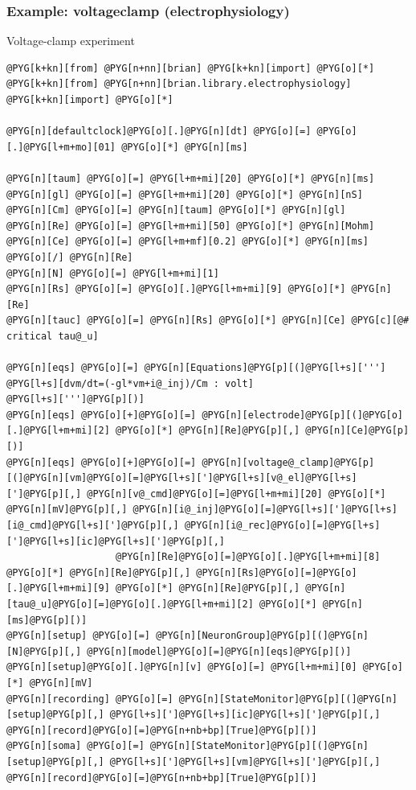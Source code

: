 \documentclass[letterpaper,10pt,english]{manual}
\begin{document}
\resetcurrentobjects
\hypertarget{--doc-examples-electrophysiology_voltageclamp}{}

\hypertarget{index-26}{}\subsubsection{Example: voltageclamp (electrophysiology)}

Voltage-clamp experiment

\begin{Verbatim}[commandchars=@\[\]]
@PYG[k+kn][from] @PYG[n+nn][brian] @PYG[k+kn][import] @PYG[o][*]
@PYG[k+kn][from] @PYG[n+nn][brian.library.electrophysiology] @PYG[k+kn][import] @PYG[o][*]

@PYG[n][defaultclock]@PYG[o][.]@PYG[n][dt] @PYG[o][=] @PYG[o][.]@PYG[l+m+mo][01] @PYG[o][*] @PYG[n][ms]

@PYG[n][taum] @PYG[o][=] @PYG[l+m+mi][20] @PYG[o][*] @PYG[n][ms]
@PYG[n][gl] @PYG[o][=] @PYG[l+m+mi][20] @PYG[o][*] @PYG[n][nS]
@PYG[n][Cm] @PYG[o][=] @PYG[n][taum] @PYG[o][*] @PYG[n][gl]
@PYG[n][Re] @PYG[o][=] @PYG[l+m+mi][50] @PYG[o][*] @PYG[n][Mohm]
@PYG[n][Ce] @PYG[o][=] @PYG[l+m+mf][0.2] @PYG[o][*] @PYG[n][ms] @PYG[o][/] @PYG[n][Re]
@PYG[n][N] @PYG[o][=] @PYG[l+m+mi][1]
@PYG[n][Rs] @PYG[o][=] @PYG[o][.]@PYG[l+m+mi][9] @PYG[o][*] @PYG[n][Re]
@PYG[n][tauc] @PYG[o][=] @PYG[n][Rs] @PYG[o][*] @PYG[n][Ce] @PYG[c][@# critical tau@_u]

@PYG[n][eqs] @PYG[o][=] @PYG[n][Equations]@PYG[p][(]@PYG[l+s][''']
@PYG[l+s][dvm/dt=(-gl*vm+i@_inj)/Cm : volt]
@PYG[l+s][''']@PYG[p][)]
@PYG[n][eqs] @PYG[o][+]@PYG[o][=] @PYG[n][electrode]@PYG[p][(]@PYG[o][.]@PYG[l+m+mi][2] @PYG[o][*] @PYG[n][Re]@PYG[p][,] @PYG[n][Ce]@PYG[p][)]
@PYG[n][eqs] @PYG[o][+]@PYG[o][=] @PYG[n][voltage@_clamp]@PYG[p][(]@PYG[n][vm]@PYG[o][=]@PYG[l+s][']@PYG[l+s][v@_el]@PYG[l+s][']@PYG[p][,] @PYG[n][v@_cmd]@PYG[o][=]@PYG[l+m+mi][20] @PYG[o][*] @PYG[n][mV]@PYG[p][,] @PYG[n][i@_inj]@PYG[o][=]@PYG[l+s][']@PYG[l+s][i@_cmd]@PYG[l+s][']@PYG[p][,] @PYG[n][i@_rec]@PYG[o][=]@PYG[l+s][']@PYG[l+s][ic]@PYG[l+s][']@PYG[p][,]
                   @PYG[n][Re]@PYG[o][=]@PYG[o][.]@PYG[l+m+mi][8] @PYG[o][*] @PYG[n][Re]@PYG[p][,] @PYG[n][Rs]@PYG[o][=]@PYG[o][.]@PYG[l+m+mi][9] @PYG[o][*] @PYG[n][Re]@PYG[p][,] @PYG[n][tau@_u]@PYG[o][=]@PYG[o][.]@PYG[l+m+mi][2] @PYG[o][*] @PYG[n][ms]@PYG[p][)]
@PYG[n][setup] @PYG[o][=] @PYG[n][NeuronGroup]@PYG[p][(]@PYG[n][N]@PYG[p][,] @PYG[n][model]@PYG[o][=]@PYG[n][eqs]@PYG[p][)]
@PYG[n][setup]@PYG[o][.]@PYG[n][v] @PYG[o][=] @PYG[l+m+mi][0] @PYG[o][*] @PYG[n][mV]
@PYG[n][recording] @PYG[o][=] @PYG[n][StateMonitor]@PYG[p][(]@PYG[n][setup]@PYG[p][,] @PYG[l+s][']@PYG[l+s][ic]@PYG[l+s][']@PYG[p][,] @PYG[n][record]@PYG[o][=]@PYG[n+nb+bp][True]@PYG[p][)]
@PYG[n][soma] @PYG[o][=] @PYG[n][StateMonitor]@PYG[p][(]@PYG[n][setup]@PYG[p][,] @PYG[l+s][']@PYG[l+s][vm]@PYG[l+s][']@PYG[p][,] @PYG[n][record]@PYG[o][=]@PYG[n+nb+bp][True]@PYG[p][)]


\end{Verbatim}
\end{document}
